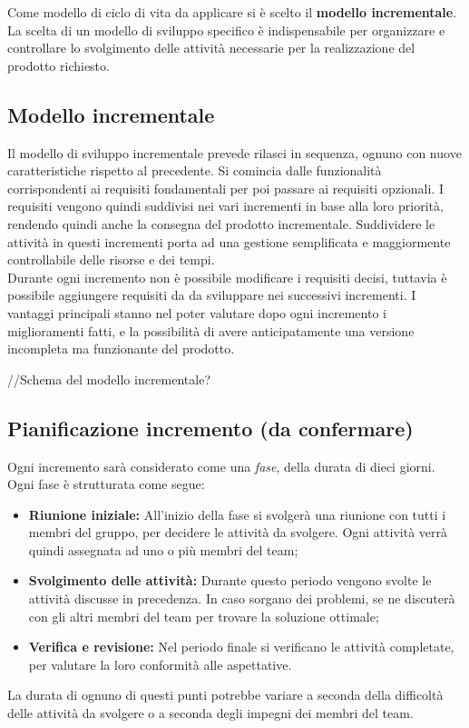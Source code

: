 Come modello di ciclo di vita da applicare si è scelto il \textbf{modello incrementale}. La scelta di un modello di sviluppo specifico è indispensabile per organizzare e controllare lo svolgimento delle attività necessarie per la realizzazione del prodotto richiesto.

\subsection{Modello incrementale}
Il modello di sviluppo incrementale prevede rilasci in sequenza, ognuno con nuove caratteristiche rispetto al precedente. Si comincia dalle funzionalità corrispondenti ai requisiti fondamentali per poi passare ai requisiti opzionali. I requisiti vengono quindi suddivisi nei vari incrementi in base alla loro priorità, rendendo quindi anche la consegna del prodotto incrementale.
Suddividere le attività in questi incrementi porta ad una gestione semplificata e maggiormente controllabile delle risorse e dei tempi.\\
Durante ogni incremento non è possibile modificare i requisiti decisi, tuttavia è possibile aggiungere requisiti da da sviluppare nei successivi incrementi.
I vantaggi principali stanno nel poter valutare dopo ogni incremento i miglioramenti fatti, e la possibilità di avere anticipatamente una versione incompleta ma funzionante del prodotto. \\
\begin{center}
//Schema del modello incrementale?
\end{center}
\subsection{Pianificazione incremento (da confermare)}
Ogni incremento sarà considerato come una \textit{fase}, della durata di dieci giorni. Ogni fase è strutturata come segue:
\begin{itemize}
\item \textbf{Riunione iniziale:} All'inizio della fase si svolgerà una riunione con tutti i membri del gruppo, per decidere le attività da svolgere. Ogni attività verrà quindi assegnata ad uno o più membri del team;
\item \textbf{Svolgimento delle attività:} Durante questo periodo vengono svolte le attività discusse in precedenza. In caso sorgano dei problemi, se ne discuterà con gli altri membri del team per trovare la soluzione ottimale;
\item \textbf{Verifica e revisione:} Nel periodo finale si verificano le attività completate, per valutare la loro conformità alle aspettative.
\end{itemize}
La durata di ognuno di questi punti potrebbe variare a seconda della difficoltà delle attività da svolgere o a seconda degli impegni dei membri del team.
\pagebreak